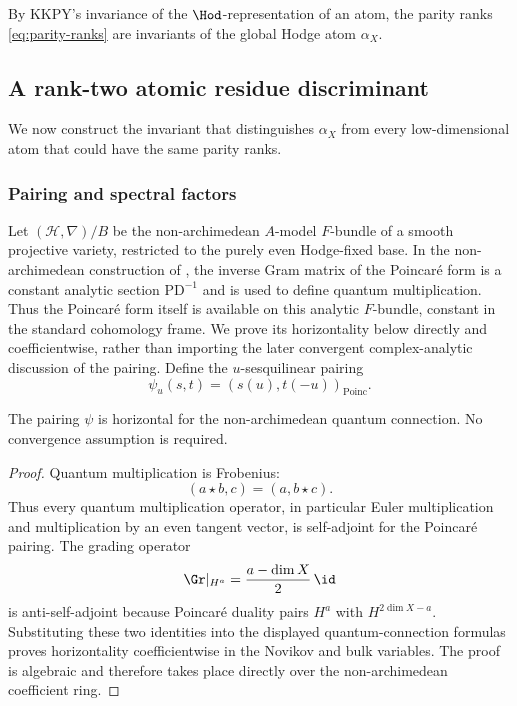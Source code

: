 By KKPY's invariance of the $\Hod$-representation of an atom, the parity ranks
\eqref{eq:parity-ranks} are invariants of the global Hodge atom $\alpha_X$.


\subsection{A rank-two atomic residue discriminant}

We now construct the invariant that distinguishes $\alpha_X$ from every
low-dimensional atom that could have the same parity ranks.

\subsubsection{Pairing and spectral factors}

Let $(\mathcal H,\nabla)/B$ be the non-archimedean $A$-model $F$-bundle of a
smooth projective variety, restricted to the purely even Hodge-fixed base.
In the non-archimedean construction of \cite[Section~3.5.2]{KKPYY}, the
inverse Gram matrix of the Poincar\'e form is a constant analytic section
$\mathrm{PD}^{-1}$ and is used to define quantum multiplication.  Thus the
Poincar\'e form itself is available on this analytic $F$-bundle, constant in
the standard cohomology frame.  We prove its horizontality below directly
and coefficientwise, rather than importing the later convergent
complex-analytic discussion of the pairing.  Define the $u$-sesquilinear pairing
\[
  \psi_u(s,t)=(s(u),t(-u))_{\mathrm{Poinc}}.
\]

\begin{lemma}\label{lem:horiz}
%
%
%
The pairing $\psi$ is horizontal for the non-archimedean quantum connection.
No convergence assumption is required.
\end{lemma}

\begin{proof}
Quantum multiplication is Frobenius:
\[
  (a\star b,c)=(a,b\star c).
\]
Thus every quantum multiplication operator, in particular Euler
multiplication and multiplication by an even tangent vector, is self-adjoint
for the Poincar\'e pairing.  The grading operator
\[
  \Gr|_{H^a}=\frac{a-\dim X}{2}\,\id
\]
is anti-self-adjoint because Poincar\'e duality pairs $H^a$ with
$H^{2\dim X-a}$.  Substituting these two identities into the displayed
quantum-connection formulas proves horizontality coefficientwise in the
Novikov and bulk variables.  The proof is algebraic and therefore takes
place directly over the non-archimedean coefficient ring.
\end{proof}

